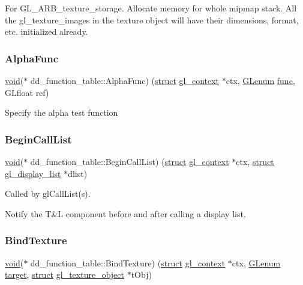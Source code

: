 For G\+L\+\_\+\+A\+R\+B\+\_\+texture\+\_\+storage. Allocate memory for whole mipmap stack. All the gl\+\_\+texture\+\_\+images in the texture object will have their dimensions, format, etc. initialized already. \mbox{\label{structdd__function__table_acac707afa03c90c474a07ecd73c23ccd}} 
\subsubsection{\texorpdfstring{Alpha\+Func}{AlphaFunc}}
{\footnotesize\ttfamily \hyperlink{interfacevoid}{void}($\ast$ dd\+\_\+function\+\_\+table\+::\+Alpha\+Func) (\hyperlink{interfacestruct}{struct} \hyperlink{structgl__context}{gl\+\_\+context} $\ast$ctx, \hyperlink{interfacevoid}{G\+Lenum} \hyperlink{interfacevoid}{func}, G\+Lfloat ref)}

Specify the alpha test function \mbox{\label{structdd__function__table_aefd7eee06c86ee7548b6648fb970369e}} 
\subsubsection{\texorpdfstring{Begin\+Call\+List}{BeginCallList}}
{\footnotesize\ttfamily \hyperlink{interfacevoid}{void}($\ast$ dd\+\_\+function\+\_\+table\+::\+Begin\+Call\+List) (\hyperlink{interfacestruct}{struct} \hyperlink{structgl__context}{gl\+\_\+context} $\ast$ctx, \hyperlink{interfacestruct}{struct} \hyperlink{structgl__display__list}{gl\+\_\+display\+\_\+list} $\ast$dlist)}

Called by gl\+Call\+List(s).

Notify the T\&L component before and after calling a display list. \mbox{\label{structdd__function__table_adb02edc9fb93a4b96cfc999355ec5be7}} 
\subsubsection{\texorpdfstring{Bind\+Texture}{BindTexture}}
{\footnotesize\ttfamily \hyperlink{interfacevoid}{void}($\ast$ dd\+\_\+function\+\_\+table\+::\+Bind\+Texture) (\hyperlink{interfacestruct}{struct} \hyperlink{structgl__context}{gl\+\_\+context} $\ast$ctx, \hyperlink{interfacevoid}{G\+Lenum} \hyperlink{interfacevoid}{target}, \hyperlink{interfacestruct}{struct} \hyperlink{structgl__texture__object}{gl\+\_\+texture\+\_\+object} $\ast$t\+Obj)}


